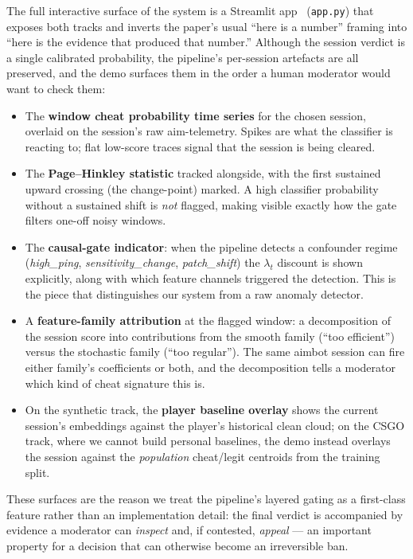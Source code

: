 \documentclass[conference,10pt]{IEEEtran}
\begin{document}
The full interactive surface of the system is a Streamlit
app~\cite{streamlit} (\texttt{app.py}) that exposes both tracks and
inverts the paper's usual ``here is a number'' framing into ``here is
the evidence that produced that number.'' Although the session verdict
is a single calibrated probability, the pipeline's per-session
artefacts are all preserved, and the demo surfaces them in the order a
human moderator would want to check them:
\begin{itemize}
  \item The \textbf{window cheat probability time series} for the
    chosen session, overlaid on the session's raw aim-telemetry.
    Spikes are what the classifier is reacting to; flat low-score
    traces signal that the session is being cleared.
  \item The \textbf{Page--Hinkley statistic} tracked alongside, with
    the first sustained upward crossing (the change-point) marked. A
    high classifier probability without a sustained shift is
    \emph{not} flagged, making visible exactly how the gate filters
    one-off noisy windows.
  \item The \textbf{causal-gate indicator}: when the pipeline detects
    a confounder regime (\emph{high\_ping}, \emph{sensitivity\_change},
    \emph{patch\_shift}) the $\lambda_t$ discount is shown explicitly,
    along with which feature channels triggered the detection. This is
    the piece that distinguishes our system from a raw anomaly
    detector.
  \item A \textbf{feature-family attribution} at the flagged window:
    a decomposition of the session score into contributions from the
    smooth family (``too efficient'') versus the stochastic family
    (``too regular''). The same aimbot session can fire either
    family's coefficients or both, and the decomposition tells a
    moderator which kind of cheat signature this is.
  \item On the synthetic track, the \textbf{player baseline overlay}
    shows the current session's embeddings against the player's
    historical clean cloud; on the CSGO track, where we cannot build
    personal baselines, the demo instead overlays the session against
    the \emph{population} cheat/legit centroids from the training
    split.
\end{itemize}
These surfaces are the reason we treat the pipeline's layered gating
as a first-class feature rather than an implementation detail: the
final verdict is accompanied by evidence a moderator can
\emph{inspect} and, if contested, \emph{appeal} --- an important
property for a decision that can otherwise become an irreversible ban.
\end{document}
